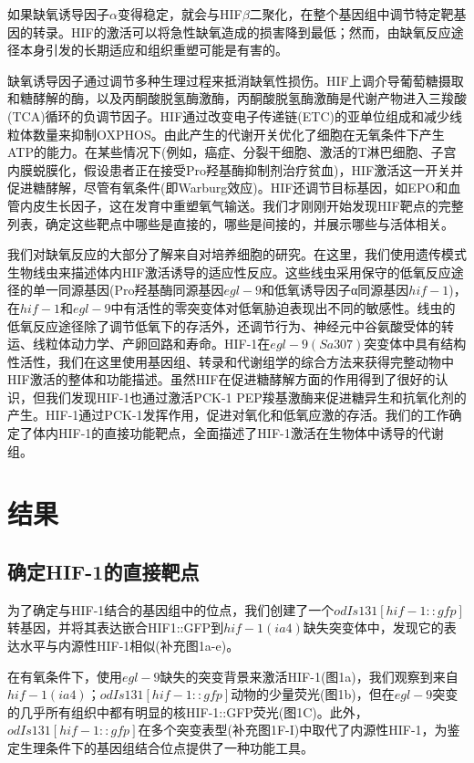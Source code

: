\documentclass{ctexart}
\begin{document}
        如果缺氧诱导因子$\alpha$变得稳定，就会与HIF$\beta$二聚化，在整个基因组中调节特定靶基因的转录。HIF的激活可以将急性缺氧造成的损害降到最低；然而，由缺氧反应途径本身引发的长期适应和组织重塑可能是有害的。

        缺氧诱导因子通过调节多种生理过程来抵消缺氧性损伤。HIF上调介导葡萄糖摄取和糖酵解的酶，以及丙酮酸脱氢酶激酶，丙酮酸脱氢酶激酶是代谢产物进入三羧酸(TCA)循环的负调节因子。HIF通过改变电子传递链(ETC)的亚单位组成和减少线粒体数量来抑制OXPHOS。由此产生的代谢开关优化了细胞在无氧条件下产生ATP的能力。在某些情况下(例如，癌症、分裂干细胞、激活的T淋巴细胞、子宫内膜蜕膜化，假设患者正在接受Pro羟基酶抑制剂治疗贫血)，HIF激活这一开关并促进糖酵解，尽管有氧条件(即Warburg效应)。HIF还调节目标基因，如EPO和血管内皮生长因子，这在发育中重塑氧气输送。我们才刚刚开始发现HIF靶点的完整列表，确定这些靶点中哪些是直接的，哪些是间接的，并展示哪些与活体相关。

        我们对缺氧反应的大部分了解来自对培养细胞的研究。在这里，我们使用遗传模式生物线虫来描述体内HIF激活诱导的适应性反应。这些线虫采用保守的低氧反应途径的单一同源基因(Pro羟基酶同源基因$egl-9$和低氧诱导因子α同源基因$hif-1$)，在$hif-1$和$egl-9$中有活性的零突变体对低氧胁迫表现出不同的敏感性。线虫的低氧反应途径除了调节低氧下的存活外，还调节行为、神经元中谷氨酸受体的转运、线粒体动力学、产卵回路和寿命。HIF-1在$egl-9(Sa307)$突变体中具有结构性活性，我们在这里使用基因组、转录和代谢组学的综合方法来获得完整动物中HIF激活的整体和功能描述。虽然HIF在促进糖酵解方面的作用得到了很好的认识，但我们发现HIF-1也通过激活PCK-1 PEP羧基激酶来促进糖异生和抗氧化剂的产生。HIF-1通过PCK-1发挥作用，促进对氧化和低氧应激的存活。我们的工作确定了体内HIF-1的直接功能靶点，全面描述了HIF-1激活在生物体中诱导的代谢组。


    

    \section{结果}
    \subsection{确定HIF-1的直接靶点}

        为了确定与HIF-1结合的基因组中的位点，我们创建了一个$odIs131[hif-1::gfp]$转基因，并将其表达嵌合HIF1::GFP到$hif-1(ia4)$缺失突变体中，发现它的表达水平与内源性HIF-1相似(补充图1a-e)。

        在有氧条件下，使用$egl-9$缺失的突变背景来激活HIF-1(图1a)，我们观察到来自$hif-1(ia4)$；$odIs131[hif-1::gfp]$动物的少量荧光(图1b)，但在$egl-9$突变的几乎所有组织中都有明显的核HIF-1::GFP荧光(图1C)。此外，$odIs131[hif-1::gfp]$在多个突变表型(补充图1F-I)中取代了内源性HIF-1，为鉴定生理条件下的基因组结合位点提供了一种功能工具。
        
\end{document}
